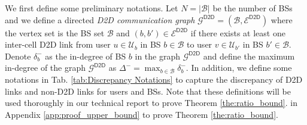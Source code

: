 We first define some preliminary notations. Let $N=|\mathcal{B}|$ be the number of BSs and we define
a directed \emph{D2D communication graph} $\mathcal{G}^{\textsf{D2D}}= (\mathcal{B}, \mathcal{E}^{\textsf{D2D}})$
where the vertex set is the BS set $\mathcal{B}$ and $(b,b') \in \mathcal{E}^{\textsf{D2D}}$
if there  exists at least one inter-cell D2D link from user $u \in \mathcal{U}_b$ in BS $b \in \mathcal{B}$
to user $v \in \mathcal{U}_{b'}$ in BS $b' \in \mathcal{B}$.
Denote $\delta^-_b$ as the in-degree of BS $b$ in the graph $\mathcal{G}^{\textsf{D2D}}$
and define the maximum in-degree of the graph $\mathcal{G}^{\textsf{D2D}}$ as $\Delta^- = \max_{b \in \mathcal{B}} \delta^-_b$.
In addition, we define some notations in Tab. \ref{tab:Discrepancy Notations}
to capture the discrepancy of D2D links and non-D2D links for users and BSs.
Note that these definitions will be used thoroughly
\ifx \ISTR \undefined
in our technical report \cite{TR} to prove {Theorem} \ref{the:ratio_bound}.
\else
in Appendix \ref{app:proof_upper_bound} to prove {Theorem} \ref{the:ratio_bound}.
\fi


%


